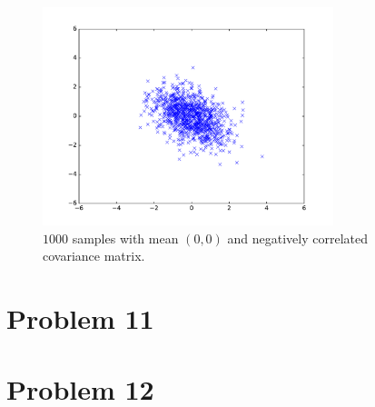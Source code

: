 \documentclass[12pt]{article}
\begin{document}
\begin{figure}[H]
        \begin{center}
                \includegraphics[height=2.5in]{Problem10-e}
                \caption{\(1000\) samples with mean \((0,0)\) and negatively correlated covariance matrix.}
        \end{center}
\end{figure}

\section*{Problem 11}



\section*{Problem 12}
\end{document}

